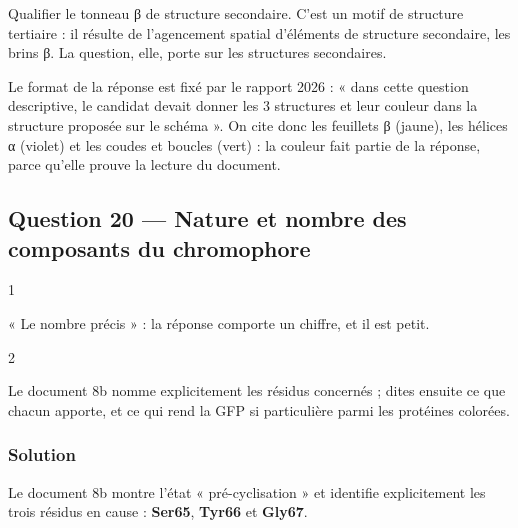 \documentclass[11pt,a4paper]{article}
\begin{document}
\begin{piege}

Qualifier le tonneau β de structure secondaire. C'est un motif de structure tertiaire : il résulte de l'agencement spatial d'éléments de structure secondaire, les brins β. La question, elle, porte sur les structures secondaires.

\end{piege}

\begin{jury}

Le format de la réponse est fixé par le rapport 2026 : « dans cette question descriptive, le candidat devait donner les 3 structures et leur couleur dans la structure proposée sur le schéma ». On cite donc les feuillets β (jaune), les hélices α (violet) et les coudes et boucles (vert) : la couleur fait partie de la réponse, parce qu'elle prouve la lecture du document.

\end{jury}

\hypertarget{question-20-nature-et-nombre-des-composants-du-chromophore}{%
\subsection{Question 20 --- Nature et nombre des composants du chromophore}\label{question-20-nature-et-nombre-des-composants-du-chromophore}}

\begin{indication}{1}

« Le nombre précis » : la réponse comporte un chiffre, et il est petit.

\end{indication}

\begin{indication}{2}

Le document 8b nomme explicitement les résidus concernés ; dites ensuite ce que chacun apporte, et ce qui rend la GFP si particulière parmi les protéines colorées.

\end{indication}

\hypertarget{solution-19}{%
\subsubsection{Solution}\label{solution-19}}

Le document 8b montre l'état « pré-cyclisation » et identifie explicitement les trois résidus en cause : \textbf{Ser65}, \textbf{Tyr66} et \textbf{Gly67}.
\end{document}
